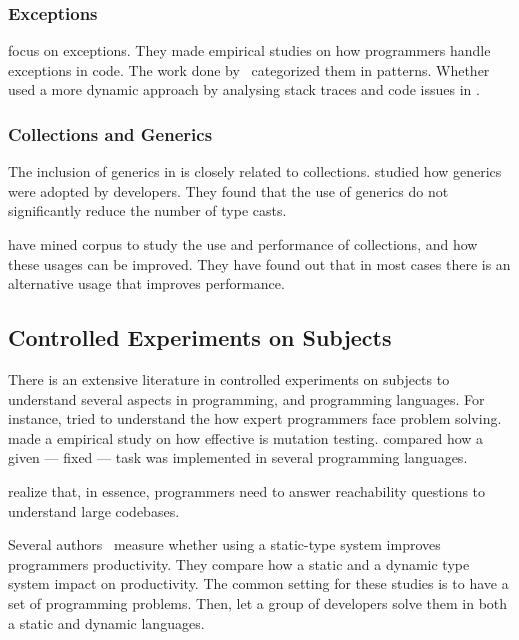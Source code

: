 \subsubsection*{\textbf{Exceptions}}

\cite{kery_examining_2016,asaduzzaman_how_2016} focus on exceptions. 
They made empirical studies on how programmers handle exceptions in \java{} code. 
The work done by~\cite{nakshatri_analysis_2016} categorized them in patterns. 
Whether~\cite{coelho_unveiling_2015} used a more dynamic approach by analysing stack traces and code issues in \github{}. 

\subsubsection*{\textbf{Collections and Generics}}

The inclusion of generics in \java{} is closely related to collections. 
\cite{parnin_java_2011,parnin_adoption_2013} studied how generics were adopted by \java{} developers. 
They found that the use of generics do not significantly reduce the number of type casts. 

\cite{costa_empirical_2017} have mined \github{} corpus to study the use and performance of collections, and how these usages can be improved. 
They have found out that in most cases there is an alternative usage that improves performance. 

\subsection{Controlled Experiments on Subjects} \label{sec:rw:experiments}

There is an extensive literature \perse{} in controlled experiments on subjects to understand several aspects in programming, and programming languages. 
For instance, \cite{soloway_empirical_1984} tried to understand the how expert programmers face problem solving. 
\cite{budd_theoretical_1980} made a empirical study on how effective is mutation testing. 
\cite{prechelt_empirical_2000} compared how a given --- fixed --- task was implemented in several programming languages. 

\cite{latoza_developers_2010} realize that, in essence, programmers need to answer reachability questions to understand large codebases. 

Several authors~\cite{stuchlik_static_2011,mayer_empirical_2012,harlin_impact_2017} measure whether using a static-type system improves programmers productivity. 
They compare how a static and a dynamic type system impact on productivity. 
The common setting for these studies is to have a set of programming problems. 
Then, let a group of developers solve them in both a static and dynamic languages. 

